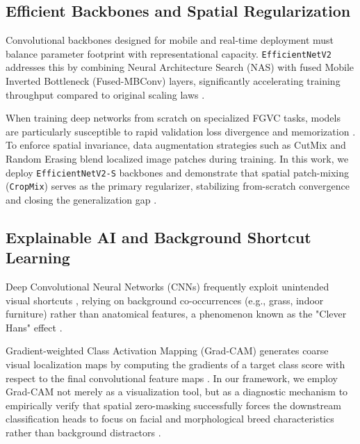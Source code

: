 \subsection{Efficient Backbones and Spatial Regularization}
Convolutional backbones designed for mobile and real-time deployment must balance parameter footprint with representational capacity. \texttt{EfficientNetV2} addresses this by combining Neural Architecture Search (NAS) with fused Mobile Inverted Bottleneck (Fused-MBConv) layers, significantly accelerating training throughput compared to original scaling laws \cite{tan2021efficientnetv2, tan2019efficientnet}.

When training deep networks from scratch on specialized FGVC tasks, models are particularly susceptible to rapid validation loss divergence and memorization \cite{prechelt1998early}. To enforce spatial invariance, data augmentation strategies such as CutMix \cite{yun2019cutmix} and Random Erasing \cite{zhong2020random} blend localized image patches during training. In this work, we deploy \texttt{EfficientNetV2-S} backbones and demonstrate that spatial patch-mixing (\texttt{CropMix}) serves as the primary regularizer, stabilizing from-scratch convergence and closing the generalization gap \cite{tan2021efficientnetv2, yun2019cutmix}.

\subsection{Explainable AI and Background Shortcut Learning}
Deep Convolutional Neural Networks (CNNs) frequently exploit unintended visual shortcuts \cite{geirhos2020shortcut}, relying on background co-occurrences (e.g., grass, indoor furniture) rather than anatomical features, a phenomenon known as the "Clever Hans" effect \cite{lapuschkin2019unmasking}. 

Gradient-weighted Class Activation Mapping (Grad-CAM) generates coarse visual localization maps by computing the gradients of a target class score with respect to the final convolutional feature maps \cite{selvaraju2017grad}. In our framework, we employ Grad-CAM not merely as a visualization tool, but as a diagnostic mechanism to empirically verify that spatial zero-masking successfully forces the downstream classification heads to focus on facial and morphological breed characteristics rather than background distractors \cite{selvaraju2017grad, geirhos2020shortcut}.